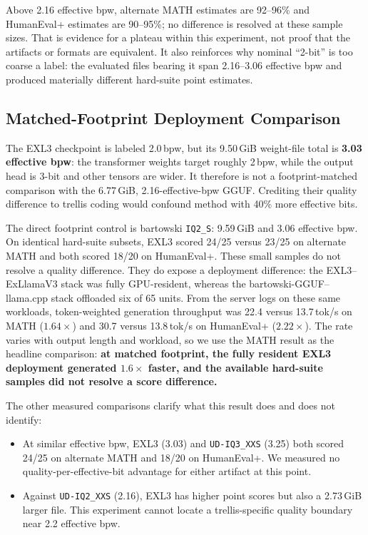 \documentclass[11pt]{article}
\newcommand{\q}[1]{\texttt{#1}}
\begin{document}
Above 2.16 effective bpw, alternate MATH estimates are 92--96\% and HumanEval+
estimates are 90--95\%; no difference is resolved at these sample sizes. That
is evidence for a plateau within this experiment, not proof that the artifacts
or formats are equivalent. It also reinforces why nominal ``2-bit'' is too
coarse a label: the evaluated files bearing it span 2.16--3.06 effective bpw
and produced materially different hard-suite point estimates.


\subsection{Matched-Footprint Deployment Comparison}
\label{sec:exl3}

The EXL3 checkpoint is labeled 2.0\,bpw, but its 9.50\,GiB weight-file total is
\textbf{3.03 effective bpw}: the transformer weights target roughly 2\,bpw,
while the output head is 3-bit and other tensors are wider. It therefore is
not a footprint-matched comparison with the 6.77\,GiB, 2.16-effective-bpw
GGUF. Crediting their quality difference to trellis coding would confound
method with 40\% more effective bits.

The direct footprint control is bartowski \q{IQ2\_S}: 9.59\,GiB and 3.06
effective bpw. On identical hard-suite subsets, EXL3 scored 24/25 versus 23/25
on alternate MATH and both scored 18/20 on HumanEval+. These small samples do
not resolve a quality difference. They do expose a deployment difference: the
EXL3--ExLlamaV3 stack was fully GPU-resident, whereas the
bartowski-GGUF--llama.cpp stack offloaded six of 65 units. From the server logs
on these same workloads,
token-weighted generation throughput was 22.4 versus 13.7\,tok/s on MATH
($1.64\times$) and 30.7 versus 13.8\,tok/s on HumanEval+ ($2.22\times$).
The rate varies with output length and workload, so we use the MATH result as
the headline comparison: \textbf{at matched footprint, the fully resident
EXL3 deployment generated $1.6\times$ faster, and the available hard-suite
samples did not resolve a score difference.}

The other measured comparisons clarify what this result does and does not
identify:

\begin{itemize}
  \item At similar effective bpw, EXL3 (3.03) and \q{UD-IQ3\_XXS} (3.25)
  both scored 24/25 on alternate MATH and 18/20 on HumanEval+. We measured no
  quality-per-effective-bit advantage for either artifact at this point.
  \item Against \q{UD-IQ2\_XXS} (2.16), EXL3 has higher point scores but also
  a 2.73\,GiB larger file. This experiment cannot locate a trellis-specific
  quality boundary near 2.2 effective bpw.
\end{itemize}
\end{document}
